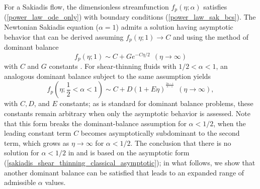 \documentclass{article}
\begin{document}
For a Sakiadis flow, the dimensionless streamfunction $f_p(\eta; \alpha)$ satisfies (\ref{power_law_ode_only}) with boundary conditions (\ref{power_law_sak_bcs}). The Newtonian Sakiadis equation ($\alpha=1$) admits a solution having asymptotic behavior that can be derived assuming $f_p(\eta; 1) \to C$ and using the method of dominant balance \begin{equation} f_p(\eta; 1) \sim C + Ge^{-C\eta/2} ~~ (\eta \to \infty)\end{equation} with $C$ and $G$ constants \cite{GenMeth}. For shear-thinning fluids with $1/2 < \alpha < 1$, an analogous dominant balance subject to the same assumption yields \begin{equation}
    f_p\left(\eta; \frac{1}{2} < \alpha < 1\right) \sim C + D\left(1 + E\eta \right)^{^{\frac{2\alpha-1}{\alpha-1}}} ~~ (\eta \to \infty), \label{sakiadis_shear_thinning_classical_asymptotic}
\end{equation} with $C, D$, and $E$ constants; as is standard for dominant balance problems, these constants remain arbitrary when only the asymptotic behavior is assessed. Note that this form breaks the dominant-balance assumption for $\alpha < 1/2$, when the leading constant term $C$ becomes asymptotically subdominant to the second term, which grows as $\eta \to \infty$ for $\alpha < 1/2$. The conclusion that there is no solution for $\alpha<1/2$ in \cite{Fox} and \cite{NonNewtonian} is based on the asymptotic form (\ref{sakiadis_shear_thinning_classical_asymptotic}); in what follows, we show that another dominant balance can be satisfied that leads to an expanded range of admissible $\alpha$ values.
\end{document}

